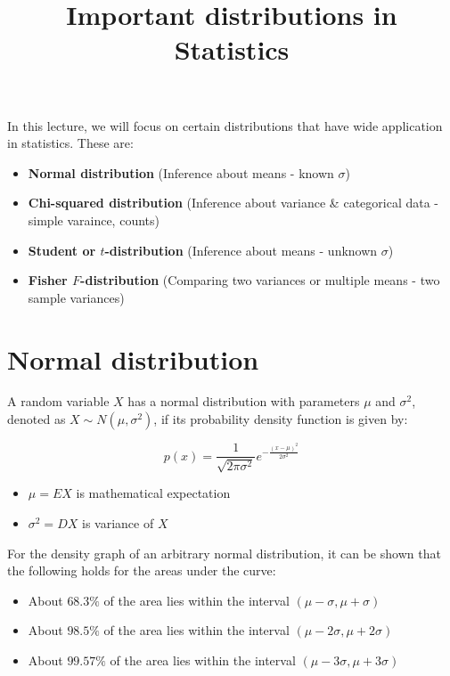 \documentclass[a4paper, 12pt]{article}
\title{
  \vspace{-1.5cm}
  \textbf{Important distributions in Statistics}
  \vspace{-1.5cm}
}
\date{}
\begin{document}
\maketitle

In this lecture, we will focus on certain distributions that have wide application in statistics. These are:

\begin{itemize}
  \item \textbf{Normal distribution} (Inference about means - known $\sigma$)
  \item \textbf{Chi-squared distribution} (Inference about variance \& categorical data - simple varaince, counts)
  \item \textbf{Student or $t$-distribution} (Inference about means - unknown $\sigma$)
  \item \textbf{Fisher $F$-distribution} (Comparing two variances or multiple means - two sample variances)
\end{itemize}


\section{Normal distribution}

A random variable $X$ has a normal distribution with parameters $\mu$ and $\sigma^2$, denoted as $X \sim N(\mu, \sigma^2)$, if its probability density function is given by:


\[ p(x) = \frac{1}{\sqrt{2\pi \sigma^2}} e^{-\frac{(x-\mu)^2}{2\sigma^2}} \]

\begin{itemize}
  \item [] $\mu = EX$ is mathematical expectation
  \item [] $\sigma^2 = DX$ is variance of $X$
\end{itemize}


For the density graph of an arbitrary normal distribution, it can be shown that the following holds for the areas under the curve:

\begin{itemize}
  \item About $68.3\%$ of the area lies within the interval $(\mu - \sigma, \mu + \sigma)$
  \item About $98.5\%$ of the area lies within the interval $(\mu - 2\sigma, \mu + 2\sigma)$
  \item About $99.57\%$ of the area lies within the interval $(\mu - 3\sigma, \mu + 3\sigma)$
\end{itemize}
\end{document}
